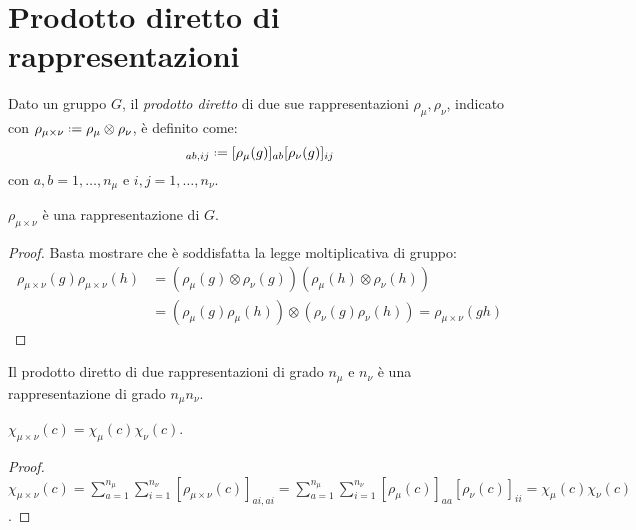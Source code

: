 \section{Prodotto diretto di rappresentazioni}

\begin{definition}
	Dato un gruppo $ G $, il \textit{prodotto diretto} di due sue rappresentazioni $ \rho_{\mu}, \rho_{\nu} $, indicato con $ \rho_{\mu \times \nu} \defeq \rho_{\mu} \otimes \rho_{\nu} $, è definito come:
	\begin{equation}
		[\rho_{\mu \times \nu}(g)]_{ab,ij} \defeq [\rho_{\mu}(g)]_{ab} [\rho_{\nu}(g)]_{ij}
		\label{eq:8.29}
	\end{equation}
	con $ a,b = 1,\dots,n_{\mu} $ e $ i,j = 1,\dots,n_{\nu} $.
\end{definition}

\begin{proposition}
	$ \rho_{\mu \times \nu} $ è una rappresentazione di $ G $.
\end{proposition}
\begin{proof}
	Basta mostrare che è soddisfatta la legge moltiplicativa di gruppo:
	\begin{equation*}
		\begin{split}
			\rho_{\mu \times \nu}(g) \rho_{\mu \times \nu}(h)
			&= (\rho_{\mu}(g) \otimes \rho_{\nu}(g))(\rho_{\mu}(h) \otimes \rho_{\nu}(h)) \\
			&= (\rho_{\mu}(g) \rho_{\mu}(h)) \otimes (\rho_{\nu}(g) \rho_{\nu}(h)) = \rho_{\mu \times \nu}(gh)
		\end{split}
	\end{equation*}
\end{proof}

Il prodotto diretto di due rappresentazioni di grado $ n_{\mu} $ e $ n_{\nu} $ è una rappresentazione di grado $ n_{\mu} n_{\nu} $.

\begin{proposition}
	$ \chi_{\mu \times \nu}(c) = \chi_{\mu}(c) \chi_{\nu}(c) $.
\end{proposition}
\begin{proof}
	$ \chi_{\mu \times \nu}(c) = \sum_{a = 1}^{n_{\mu}} \sum_{i = 1}^{n_{\nu}} [\rho_{\mu \times \nu}(c)]_{ai,ai} = \sum_{a = 1}^{n_{\mu}} \sum_{i = 1}^{n_{\nu}} [\rho_{\mu}(c)]_{aa} [\rho_{\nu}(c)]_{ii} = \chi_{\mu}(c) \chi_{\nu}(c) $.
\end{proof}

